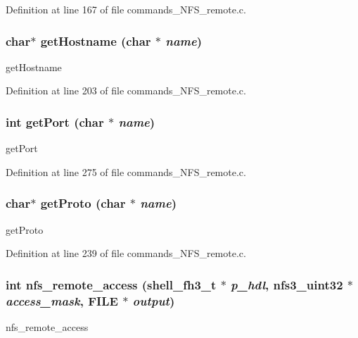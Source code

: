 Definition at line 167 of file commands\_\-NFS\_\-remote.c.
\subsubsection[{getHostname}]{\setlength{\rightskip}{0pt plus 5cm}char$\ast$ getHostname (char $\ast$ {\em name})}\label{commands__NFS__remote_8c_a7f19a0cd19fad157b921ce4002a5b8fb}
getHostname 

Definition at line 203 of file commands\_\-NFS\_\-remote.c.
\subsubsection[{getPort}]{\setlength{\rightskip}{0pt plus 5cm}int getPort (char $\ast$ {\em name})}\label{commands__NFS__remote_8c_aecc4073ed5d4285fc54cbb30ffd0d778}
getPort 

Definition at line 275 of file commands\_\-NFS\_\-remote.c.
\subsubsection[{getProto}]{\setlength{\rightskip}{0pt plus 5cm}char$\ast$ getProto (char $\ast$ {\em name})}\label{commands__NFS__remote_8c_adf6ab2b25dce11f57a22c92654602f20}
getProto 

Definition at line 239 of file commands\_\-NFS\_\-remote.c.
\subsubsection[{nfs\_\-remote\_\-access}]{\setlength{\rightskip}{0pt plus 5cm}int nfs\_\-remote\_\-access ({\bf shell\_\-fh3\_\-t} $\ast$ {\em p\_\-hdl}, \/  nfs3\_\-uint32 $\ast$ {\em access\_\-mask}, \/  FILE $\ast$ {\em output})}\label{commands__NFS__remote_8c_aae38d72f87964f3cf6d732a64ebb8df6}
nfs\_\-remote\_\-access 

